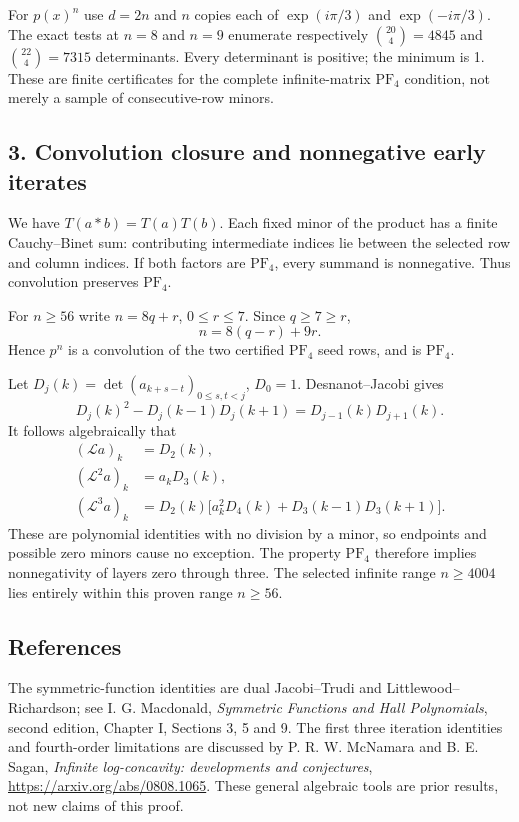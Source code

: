 \documentclass[
  11pt,
]{article}
\begin{document}
For \(p(x)^n\) use \(d=2n\) and \(n\) copies each of \(\exp(i\pi/3)\)
and \(\exp(-i\pi/3)\). The exact tests at \(n=8\) and \(n=9\) enumerate
respectively \(\binom{20}{4}=4845\) and \(\binom{22}{4}=7315\)
determinants. Every determinant is positive; the minimum is 1. These are
finite certificates for the complete infinite-matrix \(\mathrm{PF}_4\)
condition, not merely a sample of consecutive-row minors.

\subsection{3. Convolution closure and nonnegative early
iterates}\label{convolution-closure-and-nonnegative-early-iterates}

We have \(T(a*b)=T(a)T(b)\). Each fixed minor of the product has a
finite Cauchy--Binet sum: contributing intermediate indices lie between
the selected row and column indices. If both factors are
\(\mathrm{PF}_4\), every summand is nonnegative. Thus convolution
preserves \(\mathrm{PF}_4\).

For \(n\ge56\) write \(n=8q+r\), \(0\le r\le7\). Since \(q\ge7\ge r\),
\[
n=8(q-r)+9r.
\] Hence \(p^n\) is a convolution of the two certified \(\mathrm{PF}_4\)
seed rows, and is \(\mathrm{PF}_4\).

Let \(D_j(k)=\det(a_{k+s-t})_{0\le s,t<j}\), \(D_0=1\). Desnanot--Jacobi
gives \[
D_j(k)^2-D_j(k-1)D_j(k+1)=D_{j-1}(k)D_{j+1}(k).
\] It follows algebraically that \[
\begin{aligned}
(\mathcal La)_k&=D_2(k),\\
(\mathcal L^2a)_k&=a_kD_3(k),\\
(\mathcal L^3a)_k&=D_2(k)\bigl[a_k^2D_4(k)+D_3(k-1)D_3(k+1)\bigr].
\end{aligned}
\] These are polynomial identities with no division by a minor, so
endpoints and possible zero minors cause no exception. The property
\(\mathrm{PF}_4\) therefore implies nonnegativity of layers zero through
three. The selected infinite range \(n\ge4004\) lies entirely within
this proven range \(n\ge56\).

\subsection{References}\label{references}

The symmetric-function identities are dual Jacobi--Trudi and
Littlewood--Richardson; see I. G. Macdonald, \emph{Symmetric Functions
and Hall Polynomials}, second edition, Chapter I, Sections 3, 5 and 9.
The first three iteration identities and fourth-order limitations are
discussed by P. R. W. McNamara and B. E. Sagan, \emph{Infinite
log-concavity: developments and conjectures},
\url{https://arxiv.org/abs/0808.1065}. These general algebraic tools are
prior results, not new claims of this proof.
\end{document}
